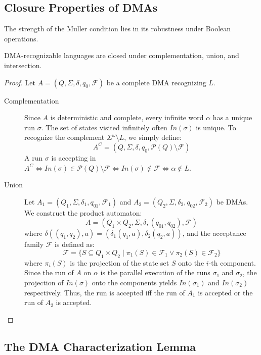 \subsection{Closure Properties of DMAs}
\label{subsec:dma-closure}

The strength of the Muller condition lies in its robustness under Boolean operations.

\begin{theorem}
DMA-recognizable languages are closed under complementation, union, and intersection.
\end{theorem}

\begin{proof}
Let $A = (Q, \Sigma, \delta, q_0, \mathcal{F})$ be a complete DMA recognizing $L$.
\begin{description}
    \item[Complementation] Since $A$ is deterministic and complete, every infinite word $\alpha$ has a unique run $\sigma$. The set of states visited infinitely often $In(\sigma)$ is unique. To recognize the complement $\Sigma^\omega \setminus L$, we simply define:
    $$A^C = (Q, \Sigma, \delta, q_0, \mathcal{P}(Q) \setminus \mathcal{F})$$
    A run $\sigma$ is accepting in $A^C \iff In(\sigma) \in \mathcal{P}(Q) \setminus \mathcal{F} \iff In(\sigma) \notin \mathcal{F} \iff \alpha \notin L$.
    
    \item[Union] Let $A_1 = (Q_1, \Sigma, \delta_1, q_{01}, \mathcal{F}_1)$ and $A_2 = (Q_2, \Sigma, \delta_2, q_{02}, \mathcal{F}_2)$ be DMAs. We construct the product automaton:
    $$A = (Q_1 \times Q_2, \Sigma, \delta, (q_{01}, q_{02}), \mathcal{F})$$
    where $\delta((q_1, q_2), a) = (\delta_1(q_1, a), \delta_2(q_2, a))$, and the acceptance family $\mathcal{F}$ is defined as:
    $$\mathcal{F} = \{ S \subseteq Q_1 \times Q_2 \mid \pi_1(S) \in \mathcal{F}_1 \lor \pi_2(S) \in \mathcal{F}_2 \}$$
    where $\pi_i(S)$ is the projection of the state set $S$ onto the $i$-th component. Since the run of $A$ on $\alpha$ is the parallel execution of the runs $\sigma_1$ and $\sigma_2$, the projection of $In(\sigma)$ onto the components yields $In(\sigma_1)$ and $In(\sigma_2)$ respectively. Thus, the run is accepted iff the run of $A_1$ is accepted or the run of $A_2$ is accepted.
\end{description}
\end{proof}

\subsection{The DMA Characterization Lemma}
\label{subsec:dma-char-lemma}

